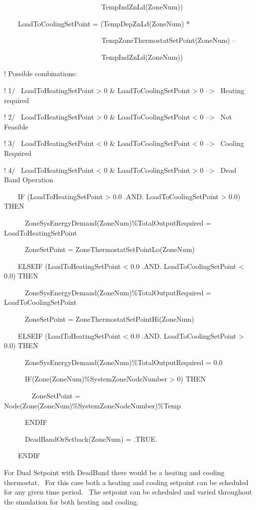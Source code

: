 ~~~~~~~~~~~~~~~~~~~~~~~~~~~~TempIndZnLd(ZoneNum))

~~~~LoadToCoolingSetPoint = (TempDepZnLd(ZoneNum) *

~~~~~~~~~~~~~~~~~~~~~~~~~~~~TempZoneThermostatSetPoint(ZoneNum) --

~~~~~~~~~~~~~~~~~~~~~~~~~~~~TempIndZnLd(ZoneNum))

! Possible combinations:

! 1/~ LoadToHeatingSetPoint \textgreater{} 0 \& LoadToCoolingSetPoint \textgreater{} 0 --\textgreater{}~ Heating required

! 2/~ LoadToHeatingSetPoint \textgreater{} 0 \& LoadToCoolingSetPoint \textless{} 0 --\textgreater{}~ Not Feasible

! 3/~ LoadToHeatingSetPoint \textless{} 0 \& LoadToCoolingSetPoint \textless{} 0 --\textgreater{}~ Cooling Required

! 4/~ LoadToHeatingSetPoint \textless{} 0 \& LoadToCoolingSetPoint \textgreater{} 0 --\textgreater{}~ Dead Band Operation

~~~~IF (LoadToHeatingSetPoint \textgreater{} 0.0 .AND. LoadToCoolingSetPoint \textgreater{} 0.0) THEN

~~~~~~ZoneSysEnergyDemand(ZoneNum)\%TotalOutputRequired = LoadToHeatingSetPoint

~~~~~~ZoneSetPoint = ZoneThermostatSetPointLo(ZoneNum)

~~~~ELSEIF (LoadToHeatingSetPoint \textless{} 0.0 .AND. LoadToCoolingSetPoint \textless{} 0.0) THEN

~~~~~~ZoneSysEnergyDemand(ZoneNum)\%TotalOutputRequired = LoadToCoolingSetPoint

~~~~~~ZoneSetPoint = ZoneThermostatSetPointHi(ZoneNum)

~~~~ELSEIF (LoadToHeatingSetPoint \textless{} 0.0 .AND. LoadToCoolingSetPoint \textgreater{} 0.0) THEN

~~~~~~ZoneSysEnergyDemand(ZoneNum)\%TotalOutputRequired = 0.0

~~~~~~IF(Zone(ZoneNum)\%SystemZoneNodeNumber \textgreater{} 0) THEN

~~~~~~~~ZoneSetPoint = Node(Zone(ZoneNum)\%SystemZoneNodeNumber)\%Temp

~~~~~~ENDIF

~~~~~~DeadBandOrSetback(ZoneNum) = .TRUE.

~~~~ENDIF

For Dual Setpoint with DeadBand there would be a heating and cooling thermostat.~ For this case both a heating and cooling setpoint can be scheduled for any given time period.~ The setpoint can be scheduled and varied throughout the simulation for both heating and cooling.


